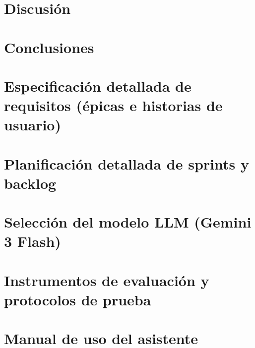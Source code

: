 \documentclass[12pt,a4paper,twoside,openright]{report}
\begin{document}
\chapter{Discusión}


\chapter{Conclusiones}


\clearpage
\printbibliography[heading=bibintoc]

\appendix

\chapter{Especificación detallada de requisitos (épicas e historias de usuario)}
\label{anexo:especificacion}


\chapter{Planificación detallada de sprints y backlog}
\label{anexo:planificacion}


\chapter{Selección del modelo LLM (Gemini 3 Flash)}
\label{anexo:seleccion_llm}


\chapter{Instrumentos de evaluación y protocolos de prueba}
\label{anexo:instrumentos}


\chapter{Manual de uso del asistente}
\label{anexo:manual}

\end{document}

